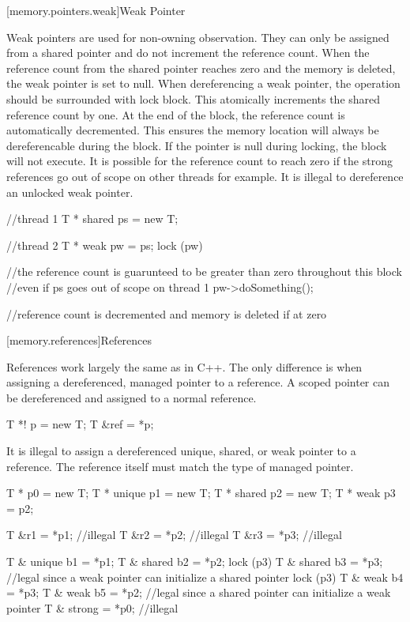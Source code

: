 [memory.pointers.weak]{Weak Pointer}

Weak pointers are used for non-owning observation. They can only be assigned from a shared pointer and do not increment the reference count. When the reference count from the shared pointer reaches zero and the memory is deleted, the weak pointer is set to null. When dereferencing a weak pointer, the operation should be surrounded with lock block. This atomically increments the shared reference count by one. At the end of the block, the reference count is automatically decremented. This ensures the memory location will always be dereferencable during the block. If the pointer is null during locking, the block will not execute. It is possible for the reference count to reach zero if the strong references go out of scope on other threads for example. It is illegal to dereference an unlocked weak pointer.

\begin{codeblock}

//thread 1
T * shared ps = new T;


//thread 2
T * weak pw = ps;
lock (pw)	
{
	//the reference count is guarunteed to be greater than zero throughout this block
	//even if ps goes out of scope on thread 1
	pw->doSomething();
	
} //reference count is decremented and memory is deleted if at zero


\end{codeblock}




[memory.references]{References}

References work largely the same as in C++. The only difference is when assigning a dereferenced, managed pointer to a reference. A scoped pointer can be dereferenced and assigned to a normal reference.

\begin{codeblock}

T *! p = new T;
T &ref = *p;

\end{codeblock}

It is illegal to assign a dereferenced unique, shared, or weak pointer to a reference. The reference itself must match the type of managed pointer.

\begin{codeblock}

T * p0 = new T;
T * unique p1 = new T;
T * shared p2 = new T;
T * weak p3 = p2;

T &r1 = *p1; //illegal
T &r2 = *p2; //illegal
T &r3 = *p3; //illegal

T & unique b1 = *p1;
T & shared b2 = *p2;
lock (p3) { T & shared b3 = *p3; } //legal since a weak pointer can initialize a shared pointer
lock (p3) { T & weak b4 = *p3; }
T & weak b5 = *p2; //legal since a shared pointer can initialize a weak pointer
T & strong = *p0; //illegal

\end{codeblock}


